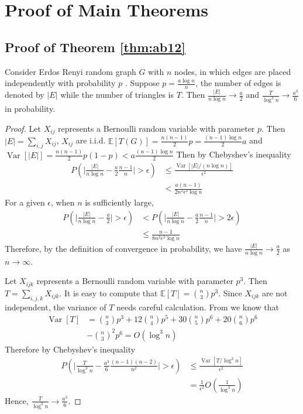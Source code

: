 \documentclass[entropy,article,submit,moreauthors,pdftex]{Definitions/mdpi}
\newcommand{\A}{\frac{a \log n}{n}}
\newcommand{\1}{\mathbbm{1}}
\DeclareMathOperator{\Var}{Var}
\begin{document}
\section{Proof of Main Theorems}
\subsection{Proof of Theorem \ref{thm:ab12}}
\begin{Lemma}\label{lem:ER_tr_counting}
	Consider Erdos Renyi random graph $G$ with $n$ nodes, in which edges are placed independently with probability $p$ \cite{erdHos1960evolution}. Suppose
	$p=\A$, the number of edges is denoted by $|E|$ while the number of triangles is $T$. Then
	$\frac{|E|}{n \log n} \to \frac{a}{2}$ and $\frac{T}{\log^3 n} \to \frac{a^3}{6}$ in probability.
\end{Lemma}
\begin{proof}
		Let $X_{ij}$ represents a Bernoulli random variable with parameter $p$. Then $|E| = \sum_{i,j} X_{ij}$, $X_{ij}$ are i.i.d.
	$\mathbb{E}[T(G)] = \frac{n(n-1)}{2}p = \frac{(n-1)\log n}{2}a$ and $\Var[|E|] = \frac{n(n-1)}{2} p(1-p) < a\frac{(n-1)\log n}{2}$
	Then by Chebyshev's inequality
	\begin{align*}
	P(\Big|\frac{|E|}{n \log n } - \frac{a}{2} \frac{n-1}{n}\Big| > \epsilon) & \leq
	\frac{\Var[|E| /(n \log n )]}{\epsilon^2} \\
	& < \frac{a(n-1)}{2n^2\epsilon^2\log n}
	\end{align*}
	For a given $\epsilon$, when $n$ is sufficiently large,
	\begin{align*}
	P(\Big|\frac{|E|}{n \log n } - \frac{a}{2} \Big| > \epsilon) & <
	P(\Big|\frac{|E|}{n \log n } - \frac{a}{2} \frac{n-1}{n}\Big| > 2\epsilon) \\
	& \leq \frac{n-1}{8n^2 \epsilon^2 \log n}
	\end{align*}
	Therefore, by the definition of convergence in probability, we have $\frac{|E|}{n \log n} \to \frac{a}{2}$ as $n\to \infty$.
	
	Let $X_{ijk}$ represents a Bernoulli random variable with parameter $p^3$.
	Then $T = \sum_{i,j,k} X_{ijk}$.
	It is easy to compute that $\mathbb{E}[T] = \binom{n}{3}p^3$. Since $X_{ijk}$ are not independent, the variance of $T$ needs careful calculation.
	From \cite{holland1977method} we know that
	\begin{align*}
	\Var[T] & = \binom{n}{3} p^3 + 12 \binom{n}{4} p^5 + 30 \binom{n}{5} p^6 + 20 \binom{n}{6} p^6\\
	 &- \binom{n}{3}^2 p^6   = O(\log^3 n)
	\end{align*}
	Therefore
	by Chebyshev's inequality
	\begin{align*}
	P(\Big|\frac{T}{\log^3 n } - \frac{a^3}{6} \frac{(n-1)(n-2)}{n^2}\Big| > \epsilon) &\leq \frac{\Var[T /\log^3 n ]}{\epsilon^2} \\ 
	& = \frac{1}{\epsilon^2}O(\frac{1}{\log^3 n})
	\end{align*}
	Hence, $\frac{T}{\log^3 n} \to \frac{a^3}{6}$.
\end{proof}
\end{document}
